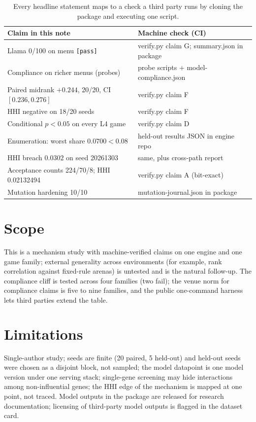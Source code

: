 \documentclass[11pt]{article}
\begin{document}
\begin{table}[h]
\centering
\small
\begin{tabular}{p{}p{}}
\toprule
\textbf{Claim in this note} & \textbf{Machine check (CI)} \\
\midrule
Llama 0/100 on menu \texttt{[pass]} & verify.py claim G; summary.json in package \\
Compliance on richer menus (probes) & probe scripts + model-compliance.json \\
Paired midrank $+0.244$, 20/20, CI $[0.236,0.276]$ & verify.py claim F \\
HHI negative on 18/20 seeds & verify.py claim F \\
Conditional $p<0.05$ on every L4 game & verify.py claim D \\
Enumeration: worst share $0.0700<0.08$ & held-out results JSON in engine repo \\
HHI breach $0.0302$ on seed 20261303 & same, plus cross-path report \\
Acceptance counts 224/70/8; HHI 0.02132494 & verify.py claim A (bit-exact) \\
Mutation hardening 10/10 & mutation-journal.json in package \\
\bottomrule
\end{tabular}
\caption{Every headline statement maps to a check a third party runs by cloning the
package and executing one script.}
\end{table}

\section{Scope}

This is a mechanism study with machine-verified claims on one engine and one
game family; external generality across environments (for example, rank
correlation against fixed-rule arenas) is untested and is the natural follow-up.
The compliance cliff is tested across four families (two fail); the venue norm
for compliance claims is five to nine families, and the public one-command harness
lets third parties extend the table.

\section{Limitations}

Single-author study; seeds are finite (20 paired, 5 held-out) and held-out seeds were
chosen as a disjoint block, not sampled; the model datapoint is one model version under
one serving stack; single-gene screening may hide interactions among non-influential
genes; the HHI edge of the mechanism is mapped at one point, not traced. Model outputs in
the package are released for research documentation; licensing of third-party model
outputs is flagged in the dataset card.
\end{document}
